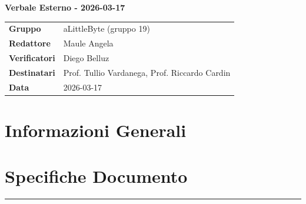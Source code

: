 \documentclass[a4paper,12pt]{article}
\begin{document}
\thispagestyle{firstpage}

\vspace*{0.5cm}

\begin{center}
    {\LARGE \textbf{Verbale Esterno - 2026-03-17}}
\end{center}

\vspace{1.5cm}

\begin{center}
    \renewcommand{\arraystretch}{1.3}
    \begin{tcolorbox}[
        width=0.92\textwidth,
        colback=gray!6,
        colframe=gray!45,
        boxrule=0.5pt,
        arc=2mm,
        boxsep=0pt,
        left=8pt, right=8pt, top=8pt, bottom=8pt
    ]
        \begin{tabularx}{\linewidth}{>{\bfseries}p{3.5cm} X}
            Gruppo      & aLittleByte (gruppo 19) \\
            Redattore   & Maule Angela \\
            Verificatori& Diego Belluz\\
            Destinatari & Prof. Tullio Vardanega, Prof. Riccardo Cardin \\
            Data        &  2026-03-17\\
        \end{tabularx}
    \end{tcolorbox}
\end{center}

\newpage

\tableofcontents
\newpage

\section{Informazioni Generali}
\section*{Specifiche Documento}
\hrule
\vspace{1cm}
\end{document}
